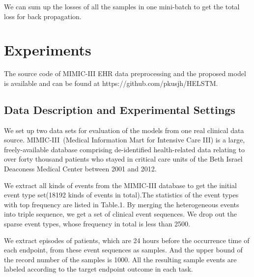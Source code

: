 \documentclass[letterpaper]{article} %
\begin{document}
We can sum up the losses of all the samples in one mini-batch to get the total loss for back propagation.


\section{Experiments}
The source code of MIMIC-III EHR data preprocessing and the proposed model is available and can be found at https://github.com/pkusjh/HELSTM.

\subsection{Data Description and Experimental Settings}
We set up two data sets for evaluation of the models from one real clinical data source. MIMIC-III~\cite{johnson2016mimic}(Medical Information Mart for Intensive Care III) is a large, freely-available database comprising de-identified health-related data relating to over forty thousand patients who stayed in critical care units of the Beth Israel Deaconess Medical Center between 2001 and 2012.

We extract all kinds of events from the MIMIC-III database to get the initial event type  set(18192 kinds of events in total).The statistics of the event types with top frequency are listed in Table.1. By merging the heterogeneous events into triple sequence, we get a set of clinical event sequences. We drop out the sparse event types, whose frequency in total is less than 2500.

We extract episodes of patients, which are 24 hours before the occurrence time of each endpoint, from these event sequences as samples. And the upper bound of the record number of the samples is 1000. All the resulting sample events are labeled according to the target endpoint outcome in each task.
\end{document}
